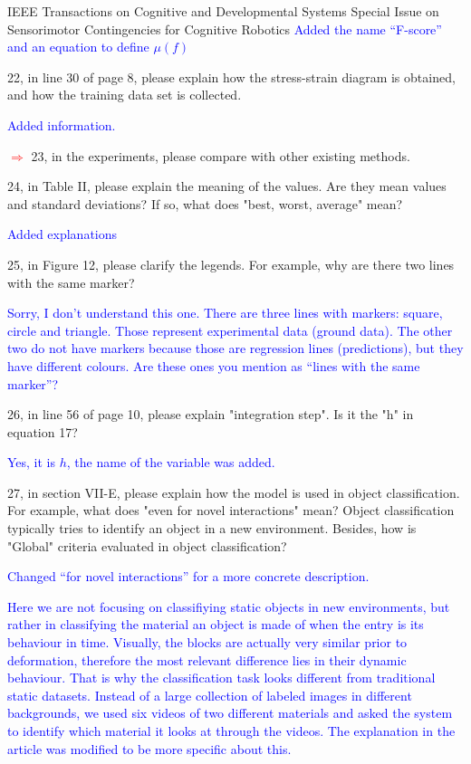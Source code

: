 \documentclass[a4paper,12pt]{letter}
\newcommand{\comment}[1]{\textcolor{blue}{#1}}
\newcommand{\marker}{\hspace*{-1.6em}\textcolor{red}{$\Longrightarrow$}}
\begin{document}
\begin{letter}{IEEE Transactions on Cognitive and Developmental Systems\newline
Special Issue on Sensorimotor Contingencies for Cognitive Robotics}
\comment{Added the name ``F-score'' and an equation to define $\mu(f)$}

22, in line 30 of page 8, please explain how the stress-strain diagram is obtained, and how the training data set is collected. 

\comment{Added information.}

\marker
23, in the experiments, please compare with other existing methods.


24, in Table II, please explain the meaning of the values. Are they mean values and standard deviations? If so, what does "best, worst, average" mean?

\comment{Added explanations}

25, in Figure 12, please clarify the legends. For example, why are there two lines with the same marker?

\comment{Sorry, I don't understand this one.  There are three lines with markers: square, circle and triangle.  Those represent experimental data (ground data).  The other two do not have markers because those are regression lines (predictions), but they have different colours.  Are these ones you mention as ``lines with the same marker''?}

26, in line 56 of page 10, please explain "integration step". Is it the "h" in equation 17?

\comment{Yes, it is $h$, the name of the variable was added.}

27, in section VII-E, please explain how the model is used in object classification. For example, what does "even for novel interactions" mean? Object classification typically tries to identify an object in a new environment. Besides, how is "Global" criteria evaluated in object classification? 

\comment{Changed ``for novel interactions'' for a more concrete description.}

\comment{Here we are not focusing on classifiying static objects in new environments, but rather in classifying the material an object is made of when the entry is its behaviour in time.  Visually, the blocks are actually very similar prior to deformation, therefore the most relevant difference lies in their dynamic behaviour.  That is why the classification task looks different from traditional static datasets.  Instead of a large collection of labeled images in different backgrounds, we used six videos of two different materials and asked the system to identify which material it looks at through the videos.  The explanation in the article was modified to be more specific about this.}


\end{letter}
\end{document}
